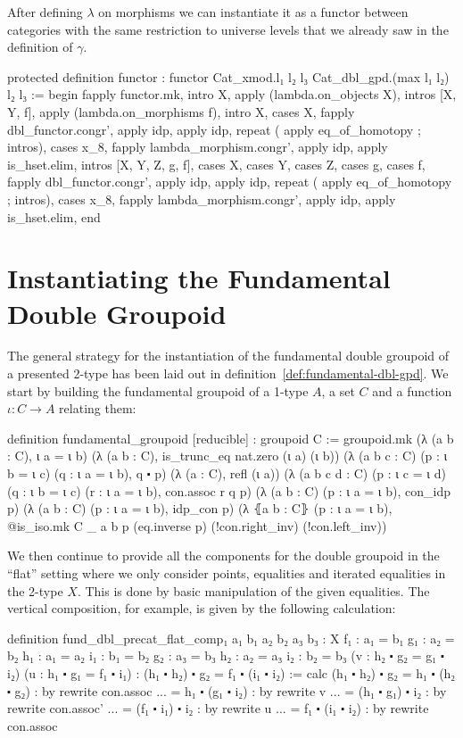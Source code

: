 After defining $\lambda$ on morphisms we can instantiate it as a functor between
categories with the same restriction to universe levels that we already saw in
the definition of $\gamma$.
\begin{leancodebr}
  protected definition functor :
    functor Cat_xmod.{l₁ l₂ l₃} Cat_dbl_gpd.{(max l₁ l₂) l₂ l₃} :=
  begin
    fapply functor.mk,
      intro X, apply (lambda.on_objects X),
      intros [X, Y, f], apply (lambda.on_morphisms f),
      intro X, cases X,
        fapply dbl_functor.congr', apply idp, apply idp,
        repeat ( apply eq_of_homotopy ; intros), cases x_8,
        fapply lambda_morphism.congr', apply idp,
        apply is_hset.elim,
      intros [X, Y, Z, g, f], cases X, cases Y, cases Z, cases g, cases f,
        fapply dbl_functor.congr', apply idp, apply idp,
        repeat ( apply eq_of_homotopy ; intros), cases x_8,
        fapply lambda_morphism.congr', apply idp,
        apply is_hset.elim,
  end
\end{leancodebr}

\section{Instantiating the Fundamental Double Group\-oid} \label{section:dbl-gpd-lean}

The general strategy for the instantiation of the fundamental double group\-oid
of a presented 2-type has been laid out in definition~\ref{def:fundamental-dbl-gpd}.
We start by building the fundamental groupoid of a 1-type $A$, a set $C$ and a
function $\iota : C \to A$ relating them:
\begin{leancodebr}
  definition fundamental_groupoid [reducible] : groupoid C :=
  groupoid.mk
    (λ (a b : C), ι a =  ι b)
    (λ (a b : C), is_trunc_eq nat.zero (ι a) (ι b))
    (λ (a b c : C) (p : ι b = ι c) (q : ι a = ι b), q ⬝ p)
    (λ (a : C), refl (ι a))
    (λ (a b c d : C) (p : ι c = ι d) (q : ι b = ι c) (r : ι a = ι b),
      con.assoc r q p)
    (λ (a b : C) (p : ι a = ι b), con_idp p)
    (λ (a b : C) (p : ι a = ι b), idp_con p)
    (λ ⦃a b : C⦄ (p : ι a = ι b),
      @is_iso.mk C _ a b p (eq.inverse p) (!con.right_inv) (!con.left_inv))
\end{leancodebr}

We then continue to provide all the components for the double groupoid in the ``flat''
setting where we only consider points, equalities and iterated equalities in the
2-type $X$.
This is done by basic manipulation of the given equalities.
The vertical composition, for example, is given by the following calculation:
\begin{leancodebr}
  definition fund_dbl_precat_flat_comp₁ {a₁ b₁ a₂ b₂ a₃ b₃ : X}
    {f₁ : a₁ = b₁} {g₁ : a₂ = b₂} {h₁ : a₁ = a₂} {i₁ : b₁ = b₂}
    {g₂ : a₃ = b₃} {h₂ : a₂ = a₃} {i₂ : b₂ = b₃}
    (v : h₂ ⬝ g₂ = g₁ ⬝ i₂) (u : h₁ ⬝ g₁ = f₁ ⬝ i₁) :
    (h₁ ⬝ h₂) ⬝ g₂ = f₁ ⬝ (i₁ ⬝ i₂) :=
  calc (h₁ ⬝ h₂) ⬝ g₂ = h₁ ⬝ (h₂ ⬝ g₂) : by rewrite con.assoc
                 ... = h₁ ⬝ (g₁ ⬝ i₂) : by rewrite v
                 ... = (h₁ ⬝ g₁) ⬝ i₂ : by rewrite con.assoc'
                 ... = (f₁ ⬝ i₁) ⬝ i₂ : by rewrite u
                 ... = f₁ ⬝ (i₁ ⬝ i₂) : by rewrite con.assoc
\end{leancodebr}

